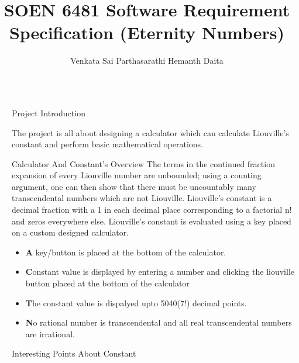 \documentclass[final]{beamer}
\title{SOEN 6481 Software Requirement Specification \newline
(Eternity Numbers)}
\author{Venkata Sai Parthasarathi Hemanth Daita }
\institute[]{ \samelineand}
\newlength{\sepwidth}
\newlength{\colwidth}
\newcommand{\separatorcolumn}{\begin{column}{\sepwidth}\end{column}}
\begin{document}
\begin{frame}[t]
\begin{columns}[t]
\separatorcolumn

\begin{column}{\colwidth}

  \begin{block}{Project Introduction}

    The project is all about designing a calculator which can calculate Liouville's constant and perform basic mathematical operations.\newline\newline

  \end{block}
\newline
\newline
\newline
  \begin{alertblock}{Calculator And Constant's Overview}
  The terms in the continued fraction expansion of every Liouville number are unbounded; using a counting argument, one can then show that there must be uncountably many transcendental numbers which are not Liouville.\newline
    Liouville's constant is a decimal fraction with a 1 in each decimal place corresponding to a factorial n! and zeros everywhere else.\newline
    Liouville's constant is evaluated using a key
    placed on a custom designed calculator.\newline
    \begin{itemize}
      \item \textbf A key/button is placed at the bottom of the calculator. 
      \item \textbf Constant value is displayed by entering a number and clicking the liouville button placed at the bottom of the calculator
      \item \textbf The constant value is dispalyed upto 5040(7!) decimal points.
      \item \textbf No rational number is transcendental and all real transcendental numbers are irrational.
    \end{itemize}

  \end{alertblock}
  \newline
  \newline

  \begin{block}{Interesting Points About Constant}



\end{block}
\end{column}
\end{columns}
\end{frame}
\end{document}
